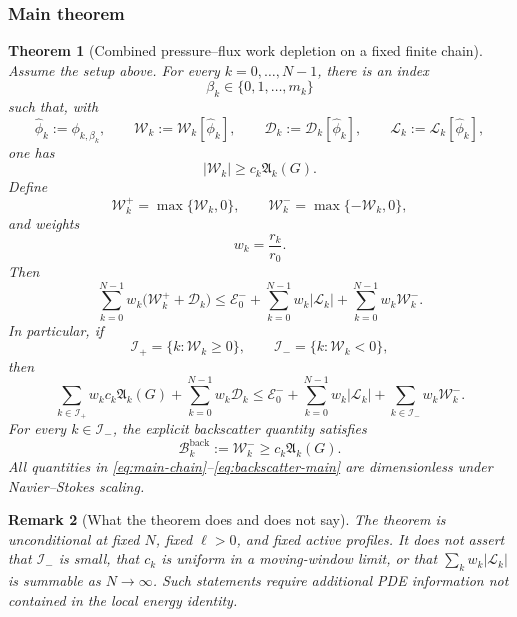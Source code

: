 \documentclass[11pt]{article}
\numberwithin{equation}{section}
\newtheorem{theorem}{Theorem}[section]
\newtheorem{remark}[theorem]{Remark}
\newcommand{\W}{\mathcal W}
\newcommand{\D}{\mathcal D}
\newcommand{\Lk}{\mathcal L}
\newcommand{\Ek}{\mathcal E}
\newcommand{\Aact}{\mathfrak A}
\newcommand{\Bback}{\mathcal B}
\begin{document}
\subsubsection{Main theorem}

\begin{theorem}[Combined pressure--flux work depletion on a fixed finite chain]\label{thm:main}
Assume the setup above. For every \(k=0,\ldots,N-1\), there is an index
\[
\beta_k\in\{0,1,\ldots,m_k\}
\]
such that, with
\begin{equation}\label{eq:selected}
\widehat\phi_k:=\phi_{k,\beta_k},
\qquad
\W_k:=\W_k[\widehat\phi_k],
\qquad
\D_k:=\D_k[\widehat\phi_k],
\qquad
\Lk_k:=\Lk_k[\widehat\phi_k],
\end{equation}
one has
\begin{equation}\label{eq:extraction-main}
|\W_k|\ge c_k\Aact_k(G).
\end{equation}
Define
\begin{equation}\label{eq:Wpm}
\W_k^+=\max\{\W_k,0\},
\qquad
\W_k^-=\max\{-\W_k,0\},
\end{equation}
and weights
\begin{equation}\label{eq:wk}
w_k=\frac{r_k}{r_0}.
\end{equation}
Then
\begin{equation}\label{eq:main-chain}
\boxed{
\sum_{k=0}^{N-1}w_k\bigl(\W_k^++\D_k\bigr)
\le
\Ek_0^-
+
\sum_{k=0}^{N-1}w_k|\Lk_k|
+
\sum_{k=0}^{N-1}w_k\W_k^-.
}
\end{equation}
In particular, if
\begin{equation}\label{eq:F-B-sets}
\mathcal I_+
=\{k:\W_k\ge0\},
\qquad
\mathcal I_-
=\{k:\W_k<0\},
\end{equation}
then
\begin{equation}\label{eq:main-active}
\boxed{
\sum_{k\in\mathcal I_+}w_kc_k\Aact_k(G)
+
\sum_{k=0}^{N-1}w_k\D_k
\le
\Ek_0^-
+
\sum_{k=0}^{N-1}w_k|\Lk_k|
+
\sum_{k\in\mathcal I_-}w_k\W_k^-.
}
\end{equation}
For every \(k\in\mathcal I_-\), the explicit backscatter quantity satisfies
\begin{equation}\label{eq:backscatter-main}
\Bback_k^{\mathrm{back}}
:=\W_k^-
\ge c_k\Aact_k(G).
\end{equation}
All quantities in \eqref{eq:main-chain}--\eqref{eq:backscatter-main} are dimensionless under Navier--Stokes scaling.
\end{theorem}

\begin{remark}[What the theorem does and does not say]\label{rem:scope}
The theorem is unconditional at fixed \(N\), fixed \(\ell>0\), and fixed active profiles. It does not assert that \(\mathcal I_-\) is small, that \(c_k\) is uniform in a moving-window limit, or that \(\sum_k w_k|\Lk_k|\) is summable as \(N\to\infty\). Such statements require additional PDE information not contained in the local energy identity.
\end{remark}
\end{document}
